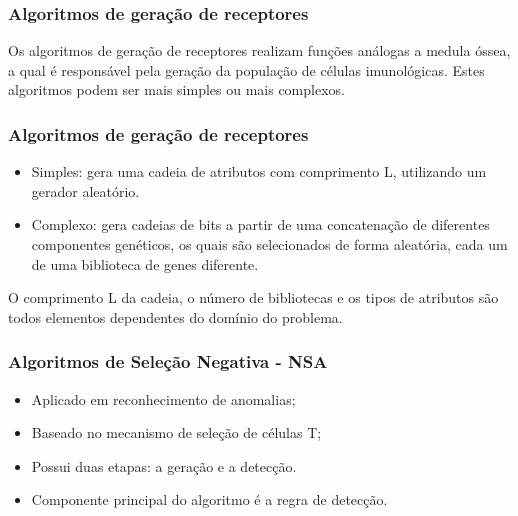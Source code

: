 \documentclass{beamer}
\begin{document}
\begin{frame}
    \frametitle{Algoritmos de geração de receptores}
    
    Os algoritmos de geração de receptores realizam funções análogas a medula óssea, a qual é responsável pela geração da população de células imunológicas. Estes algoritmos podem ser mais simples ou mais complexos.
\end{frame}
   

\begin{frame}
    \frametitle{Algoritmos de geração de receptores}
    
    \begin{itemize}
        \item Simples: gera uma cadeia de atributos com comprimento L, utilizando um gerador aleatório.
        \item Complexo: gera cadeias de bits a partir de uma concatenação de diferentes componentes genéticos, os quais são selecionados de forma aleatória, cada um de uma biblioteca de genes diferente. \cite{decastro2002}
    \end{itemize}
    
    O comprimento L da cadeia, o número de bibliotecas e os tipos de atributos são todos elementos dependentes do domínio do problema.
\end{frame}

%    


\begin{frame}
    \frametitle{Algoritmos de Seleção Negativa - NSA}
    
    \begin{itemize}
        \item Aplicado em reconhecimento de anomalias;
        \item Baseado no mecanismo de seleção de células T;
        \item Possui duas etapas: a geração e a detecção.
        \item Componente principal do algoritmo é a regra de detecção. 
    \end{itemize}
\end{frame}
\end{document}
